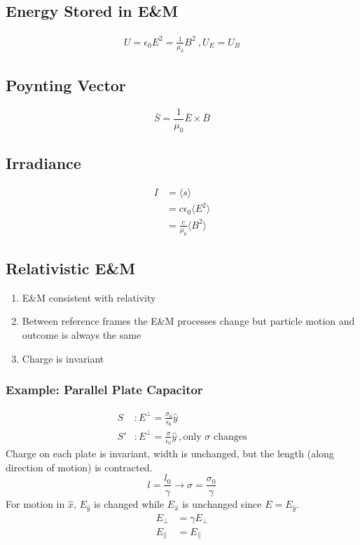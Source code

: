 \documentclass[10pt,letter]{article}
\begin{document}
\subsection{Energy Stored in E\&M}
\begin{align}
 U = \epsilon_0 E^2 = \frac{1}{\mu_0}B^2~,U_E = U_B 
\end{align}

\subsection{Poynting Vector}
\begin{equation}
 \bar{S} = \frac{1}{\mu_0} \bar{E} \times \bar{B} 
\end{equation}

\subsection{Irradiance}
\begin{align}
 I &= \langle s \rangle\\
   &=  c\epsilon_0\langle E^2 \rangle\\
   &= \frac{c}{\mu_0}\langle B^2 \rangle
\end{align}

\subsection{Relativistic E\&M}
\begin{enumerate}
    \item E\&M consistent with relativity
    \item Between reference frames the E\&M processes change but particle motion and outcome is always the same
    \item Charge is invariant
\end{enumerate}
\subsubsection{Example: Parallel Plate Capacitor}
\begin{align}
 S&: E^\perp = \frac{\sigma_0}{\epsilon_0} \hat{y}\\
 S'&:E^\perp = \frac{\sigma}{\epsilon_0}\hat{y}~,\textrm{only } \sigma \textrm{ changes}
\end{align}
Charge on each plate is invariant, width is unchanged, but the length (along direction of motion) is contracted.
\begin{equation}
 l = \frac{l_0}{\gamma} \rightarrow \sigma = \frac{\sigma_0}{\gamma}
\end{equation}
For motion in $\hat{x}$, $E_{\hat{y}}$ is changed while $E_{\hat{x}}$ is unchanged since $E = E_{\hat{y}}$. 
\begin{align}
 E_\perp &= \gamma E_\perp\\
 E_\parallel &= E_\parallel 
\end{align}
\end{document}
